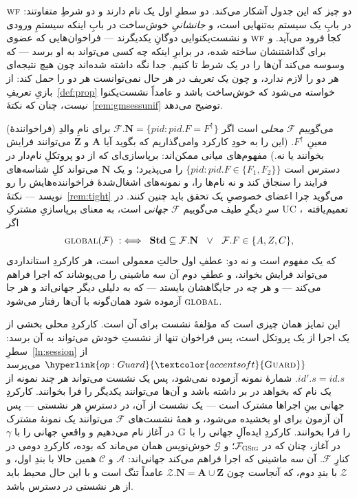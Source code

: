 \documentclass[10pt,oneside,openany]{book}
\newcommand{\PID}{\mathit{pid}}
\newcommand{\admits}{\mathbf{N}}
\newcommand{\Apid}{\mathbf{A}}
\newcommand{\Zpid}{\mathbf{Z}}
\newcommand{\Stdpid}{\mathbf{Std}}
\newcommand{\WF}{\op{wf}}
\newcommand{\Corr}{\mathcal{C}}
\newcommand{\F}{\mathcal{F}}
\newcommand{\G}{\mathcal{G}}
\newcommand{\Zenv}{\mathcal{Z}}
\newcommand{\Adv}{\mathcal{A}}
\newcommand{\op}[1]{\textnormal{\textsc{#1}}}
\newcommand{\opl}[1]{\hyperlink{op:#1}{\textcolor{accentsoft}{\op{#1}}}}
\newcommand{\id}{id}
\newcommand{\parent}{\mathord{\uparrow}}
\theoremstyle{accentdef}
\theoremstyle{accentplain}
\begin{document}
دو چیز که این جدول آشکار می‌کند. دو سطرِ اول یک نام دارند و دو شرطِ
متفاوتند: $\WF$ در بابِ یک سیستم به‌تنهایی است، و \emph{جانشانیِ}
خوش‌ساخت در بابِ اینکه سیستمِ ورودی کجا فرود می‌آید. و $\WF$ و
نشست‌یکنوایی دوگانِ یکدیگرند --- فراخوان‌هایی که عضوی برای گذاشتنشان ساخته
شده، در برابرِ اینکه چه کسی می‌تواند به او برسد --- که وسوسه می‌کند
آن‌ها را در یک شرط تا کنیم. جدا نگه داشته شده‌اند چون هیچ نتیجه‌ای هر دو
را لازم ندارد، و چون یک تعریف در هر حال نمی‌توانست هر دو را حمل کند: از
بازیِ تعریفِ~\ref{def:prop} خواسته می‌شود که خوش‌ساخت باشد و عامداً
نشست‌یکنوا \emph{نیست}، چنان که نکتهٔ~\ref{rem:gmsessunif} توضیح می‌دهد.

می‌گوییم $\F$ \emph{محلی} است اگر $\F.\admits = \{\PID : \PID.F =
F^{\parent}\}$ برای نامِ والدِ (فراخوانندهٔ) معینِ $F^{\parent}$. (این را
به خودِ کارکرد وامی‌گذاریم که بگوید آیا $\Apid$ و $\Zpid$ می‌توانند فرایش
بخوانند یا نه.) مفهوم‌های میانی ممکن‌اند: برپاسازی‌ای که از دو پروتکلِ
نام‌دار در دسترس است $\{\PID : \PID.F \in \{F_1,F_2\}\}$ را می‌پذیرد؛ و
یک $\admits$ می‌تواند کلِ شناسه‌های فرایند را سنجاق کند و نه نام‌ها را، و
نمونه‌های اشغال‌شدهٔ فراخواننده‌هایش را رو نویسد ---
نکتهٔ~\ref{rem:tight} می‌گوید چرا اعضای خصوصیِ یک تحقق باید چنین کنند. در
سرِ دیگرِ طیف می‌گوییم $\F$ \emph{جهانی} است، به معنای برپاسازیِ مشترکِ
UCِ تعمیم‌یافته~\cite{CDPW07}، اگر
\[
  \op{global}(\F) \;:\iff\; \Stdpid \subseteq \F.\admits \ \ \vee\ \ \F.F \in \{A,Z,C\} ,
\]
که یک مفهوم است و نه دو: عطفِ اول حالتِ معمولی است، هر کارکردِ استانداردی
می‌تواند فرایش بخواند، و عطفِ دوم آن سه ماشینی را می‌پوشاند که اجرا فراهم
می‌کند --- و هر چه در جایگاهشان بایستد --- که به دلیلی دیگر جهانی‌اند و
هر جا $\op{global}$ آزموده شود همان‌گونه با آن‌ها رفتار می‌شود.

این تمایز همان چیزی است که مؤلفهٔ نشست برای آن است. کارکردِ محلی بخشی از
یک اجرا از یک پروتکل است، پس فراخوان تنها از نشستِ خودش می‌تواند به آن
برسد: سطرِ~\ref{ln:session} از $\opl{Guard}$ می‌پرسد $\id'.s = \id.s$.
شمارهٔ نمونه آزموده نمی‌شود، پس یک نشست می‌تواند هر چند نمونه از یک نام که
بخواهد در بر داشته باشد و آن‌ها می‌توانند یکدیگر را فرا بخوانند. کارکردِ
جهانی بینِ اجراها مشترک است --- یک نشست از آن، در دسترسِ هر نشستی --- پس
آن آزمون برای او بخشیده می‌شود، و همهٔ نشست‌های $\F$ می‌توانند یک نمونهٔ
مشترک را فرا بخوانند. کارکردِ ایده‌آلِ جهانی را با $\op{G}$ در آغاز نام
می‌دهیم و واقعیِ جهانی را با $\gamma$ در آغاز، چنان که در
$\F_{\op{G}\op{Sig}}$؛ و $\G$ِ خوش‌نویس همان می‌ماند که بوده، کارکردِ
دومی در کنارِ $\F$. آن سه ماشینی که اجرا فراهم می‌کند جهانی‌اند: $\Adv$ و
$\Corr$ همین حالا با بندِ اول، و $\Zenv$ با بندِ دوم، که آنجاست چون
$\Zenv.\admits = \Apid \cup \Zpid$ عامداً تنگ است و با این حال محیط باید
از هر نشستی در دسترس باشد.
\end{document}

